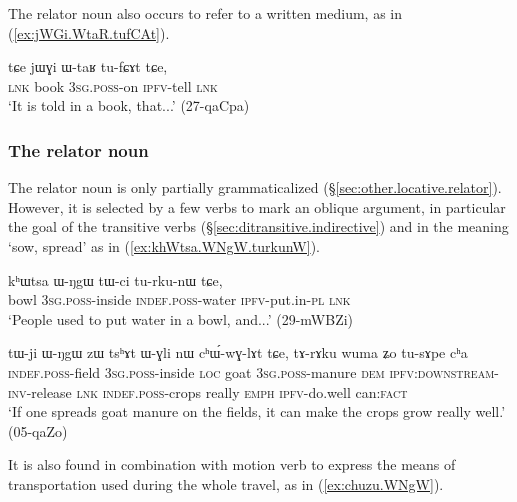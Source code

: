 The relator noun  also occurs to refer to a written medium, as in (\ref{ex:jWGi.WtaR.tufCAt}).

\begin{exe}
\ex \label{ex:jWGi.WtaR.tufCAt}
\gll  tɕe jɯɣi ɯ-taʁ tu-fɕɤt tɕe, \\
\textsc{lnk} book \textsc{3sg}.\textsc{poss}-on \textsc{ipfv}-tell \textsc{lnk} \\
\glt `It is told in a book, that...' (27-qaCpa) 	
\end{exe} 

\subsubsection{The relator noun } \label{sec:WNgW}
The relator noun  is only partially grammaticalized (§\ref{sec:other.locative.relator}). However, it is selected by a few verbs to mark an oblique argument, in particular the goal of the transitive verbs  (§\ref{sec:ditransitive.indirective}) and  in the meaning `sow, spread' as in (\ref{ex:khWtsa.WNgW.turkunW}).

\begin{exe}
\ex \label{ex:khWtsa.WNgW.turkunW}
\gll kʰɯtsa ɯ-ŋgɯ tɯ-ci tu-rku-nɯ tɕe, \\
bowl \textsc{3sg}.\textsc{poss}-inside  \textsc{indef}.\textsc{poss}-water \textsc{ipfv}-put.in-\textsc{pl} \textsc{lnk} \\
\glt `People used to put water in a bowl, and...' (29-mWBZi)
\end{exe} 

\begin{exe}
\ex \label{ex:tWji.WNgW.chWwGlAt}
\gll tɯ-ji ɯ-ŋgɯ zɯ tsʰɤt ɯ-ɣli nɯ cʰɯ́-wɣ-lɤt tɕe, tɤ-rɤku wuma ʑo tu-sɤpe cʰa \\
\textsc{indef}.\textsc{poss}-field  \textsc{3sg}.\textsc{poss}-inside \textsc{loc} goat \textsc{3sg}.\textsc{poss}-manure \textsc{dem} \textsc{ipfv}:\textsc{downstream}-\textsc{inv}-release \textsc{lnk} \textsc{indef}.\textsc{poss}-crops really \textsc{emph} \textsc{ipfv}-do.well can:\textsc{fact} \\
\glt `If one spreads goat manure on the fields, it can make the crops grow really well.' (05-qaZo) 	
\end{exe} 

It is also found in combination with motion verb to express the means of transportation used during the whole travel, as in (\ref{ex:chuzu.WNgW}).

